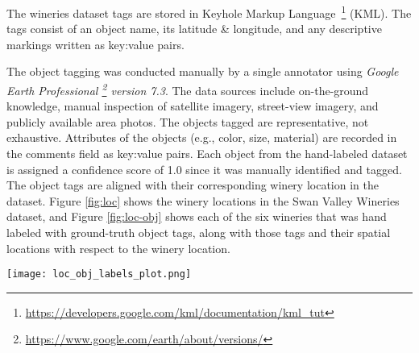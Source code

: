 The wineries dataset tags are stored in Keyhole Markup Language~\footnote{\href{https://developers.google.com/kml/documentation/kml\_tut}{https://developers.google.com/kml/documentation/kml\_tut}} (KML).
The tags consist of an object name, its latitude \& longitude, and any descriptive markings written as key:value pairs. 

The object tagging was conducted manually by a single annotator using \textit{Google Earth Professional \footnote{\href{https://www.google.com/earth/about/versions/}{https://www.google.com/earth/about/versions/}} version 7.3}. 
The data sources include on-the-ground knowledge, manual inspection of satellite imagery, street-view imagery, and publicly available area photos. 
The objects tagged are representative, not exhaustive. 
Attributes of the objects (e.g., color, size, material) are recorded in the comments field as key:value pairs.
Each object from the hand-labeled dataset is assigned a confidence score of 1.0 since it was manually identified and tagged.
The object tags are aligned with their corresponding winery location in the dataset.
Figure \ref{fig:loc} shows the winery locations in the Swan Valley Wineries dataset, and Figure \ref{fig:loc-obj} shows each of the six wineries that was hand labeled with ground-truth object tags, along with those tags and their spatial locations with respect to the winery location.


\begin{figure*}[ht]
    \texttt{[image: loc\_obj\_labels\_plot.png]}
    \centering
    \caption[width=\textwidth]{A representative view of the six wineries in the dataset shows the geospatial heterogeneity of object positions between locations.}
    \label{fig:loc-obj}  
\end{figure*}


